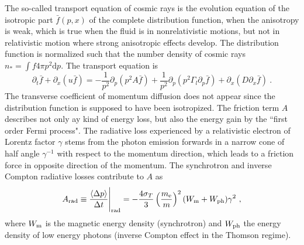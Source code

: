\documentclass[12pt,a4paper]{article}
\newcommand{\dif}{\mathrm{d}}
\begin{document}
The so-called transport equation of cosmic rays is the evolution equation of the isotropic part $\bar{f}(p, x)$ of the complete distribution function, when the anisotropy is weak, which is true when the fluid is in nonrelativistic motions, but not in relativistic motion where strong anisotropic effects develop. The distribution function is normalized such that the number density of cosmic rays $n_\ast = \int f 4\pi p^2 \dif p$. The transport equation is
\begin{equation}
\partial_t \bar{f} +\partial_x(u \bar{f}) = -\frac{1}{p^2} \partial_p(p^2 A \bar{f}) +\frac{1}{p^2} \partial_p(p^2 \Gamma_l \partial_p \bar{f} ) + \partial_x(D \partial_x \bar{f} ) ~.
\end{equation}
The transverse coefficient of momentum diffusion does not appear since the distribution function is supposed to have been isotropized. The friction term $A$ describes not only ay kind of energy loss, but also the energy gain by the ``first order Fermi process". The radiative loss experienced by a relativistic electron of Lorentz factor $\gamma$ stems from the photon emission forwards in a narrow cone of half angle $\gamma^{-1}$ with respect to the momentum direction, which leads to a friction force in opposite direction of the momentum. The synchrotron and inverse Compton radiative losses contribute to $A$ as
\begin{equation}
A_{\rm rad} \equiv \frac{\langle \Delta p \rangle}{\Delta t} \Bigg|_{\rm rad} = -\frac{4\sigma_T}{3} \left(\frac{m_{\rm e} }{m} \right)^2 (W_{\rm m} +W_{\rm ph}) \gamma^2 ~,
\end{equation}
where $W_{\rm m}$ is the magnetic energy density (synchrotron) and $W_{\rm ph}$ the energy density of low energy photons (inverse Compton effect in the Thomson regime). 
\end{document}
